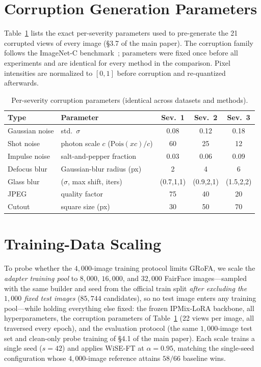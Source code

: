 \section{Corruption Generation Parameters}
\label{app:corruption}

Table~\ref{tab:corruption_params} lists the exact per-severity parameters used to pre-generate the 21 corrupted views of every image (\S3.7 of the main paper).
The corruption family follows the ImageNet-C benchmark~\cite{hendrycks2019benchmarking}; parameters were fixed once before all experiments and are identical for every method in the comparison.
Pixel intensities are normalized to $[0,1]$ before corruption and re-quantized afterwards.

\begin{table}[htbp]
\centering
\caption{Per-severity corruption parameters (identical across datasets and methods).}
\label{tab:corruption_params}
\small
\setlength{\tabcolsep}{4pt}
\begin{tabular}{llccc}
\toprule
Type & Parameter & Sev.\ 1 & Sev.\ 2 & Sev.\ 3 \\
\midrule
Gaussian noise & std.\ $\sigma$ & 0.08 & 0.12 & 0.18 \\
Shot noise & photon scale $c$ ($\mathrm{Pois}(xc)/c$) & 60 & 25 & 12 \\
Impulse noise & salt-and-pepper fraction & 0.03 & 0.06 & 0.09 \\
Defocus blur & Gaussian-blur radius (px) & 2 & 4 & 6 \\
Glass blur & ($\sigma$, max shift, iters) & (0.7,1,1) & (0.9,2,1) & (1.5,2,2) \\
JPEG & quality factor & 75 & 40 & 20 \\
Cutout & square size (px) & 30 & 50 & 70 \\
\bottomrule
\end{tabular}
\end{table}



\section{Training-Data Scaling}
\label{app:scaling}

To probe whether the $4{,}000$-image training protocol limits GRoFA, we scale the \emph{adapter training pool} to $8{,}000$, $16{,}000$, and $32{,}000$ FairFace images---sampled with the same builder and seed from the official train split \emph{after excluding the $1{,}000$ fixed test images} ($85{,}744$ candidates), so no test image enters any training pool---while holding everything else fixed: the frozen IPMix-LoRA backbone, all hyperparameters, the corruption parameters of Table~\ref{tab:corruption_params} (22 views per image, all traversed every epoch), and the evaluation protocol (the same $1{,}000$-image test set and clean-only probe training of \S4.1 of the main paper).
Each scale trains a single seed ($s{=}42$) and applies WiSE-FT at $\alpha{=}0.95$, matching the single-seed configuration whose $4{,}000$-image reference attains $58/66$ baseline wins.

